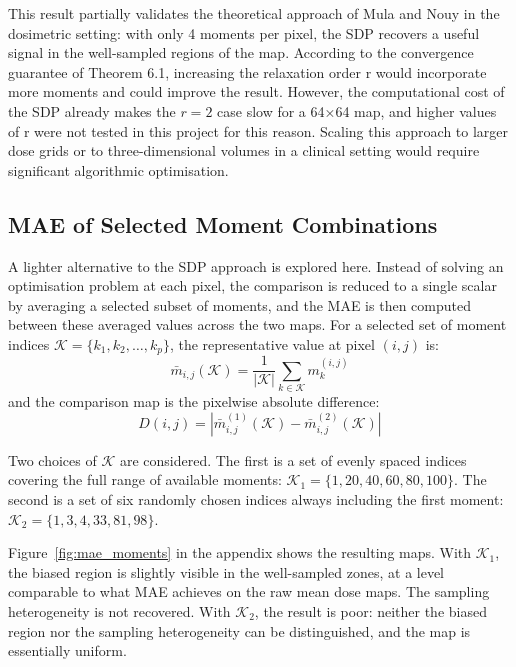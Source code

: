 \documentclass[12pt]{article}
\begin{document}
This result partially validates the theoretical approach of Mula and Nouy in the dosimetric setting: with only 4 moments per pixel, the SDP recovers a useful signal in the well-sampled regions of the map. According to the convergence guarantee of Theorem 6.1, increasing the relaxation order r would incorporate more moments and could improve the result. However, the computational cost of the SDP already makes the $r = 2$ case slow for a 64×64 map, and higher values of r were not tested in this project for this reason. Scaling this approach to larger dose grids or to three-dimensional volumes in a clinical setting would require significant algorithmic optimisation.

\subsection{MAE of Selected Moment Combinations}

A lighter alternative to the SDP approach is explored here. Instead of solving
an optimisation problem at each pixel, the comparison is reduced to a single
scalar by averaging a selected subset of moments, and the MAE is then computed
between these averaged values across the two maps. For a selected set of moment
indices $\mathcal{K} = \{k_1, k_2, \ldots, k_p\}$, the representative value at
pixel $(i,j)$ is:
\begin{equation}
    \bar{m}_{i,j}(\mathcal{K}) = \frac{1}{|\mathcal{K}|}
    \sum_{k \in \mathcal{K}} m_k^{(i,j)}
\end{equation}
and the comparison map is the pixelwise absolute difference:
\begin{equation}
    D(i,j) = \left| \bar{m}_{i,j}^{(1)}(\mathcal{K})
    - \bar{m}_{i,j}^{(2)}(\mathcal{K}) \right|
\end{equation}

Two choices of $\mathcal{K}$ are considered. The first is a set of evenly spaced
indices covering the full range of available moments:
$\mathcal{K}_1 = \{1, 20, 40, 60, 80, 100\}$. The second is a set of six
randomly chosen indices always including the first moment:
$\mathcal{K}_2 = \{1, 3, 4, 33, 81, 98\}$.

Figure~\ref{fig:mae_moments} in the appendix shows the resulting maps. With $\mathcal{K}_1$,
the biased region is slightly visible in the well-sampled zones, at a level
comparable to what MAE achieves on the raw mean dose maps. The sampling
heterogeneity is not recovered. With $\mathcal{K}_2$, the result is poor:
neither the biased region nor the sampling heterogeneity can be distinguished,
and the map is essentially uniform.
\end{document}
